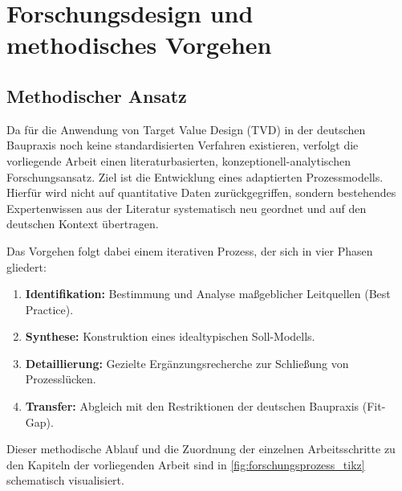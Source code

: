 \chapter{Forschungsdesign und methodisches Vorgehen}
\label{ch:3}

\section{Methodischer Ansatz}
\label{sec:3.1}

Da für die Anwendung von Target Value Design (\acs{TVD}) in der deutschen Baupraxis noch keine standardisierten Verfahren existieren, verfolgt die vorliegende Arbeit einen literaturbasierten, konzeptionell-analytischen Forschungsansatz. Ziel ist die Entwicklung eines adaptierten Prozessmodells. Hierfür wird nicht auf quantitative Daten zurückgegriffen, sondern bestehendes Expertenwissen aus der Literatur systematisch neu geordnet und auf den deutschen Kontext übertragen.

Das Vorgehen folgt dabei einem iterativen Prozess, der sich in vier Phasen gliedert:
\begin{enumerate}
    \item \textbf{Identifikation:} Bestimmung und Analyse maßgeblicher Leitquellen (Best Practice).
    \item \textbf{Synthese:} Konstruktion eines idealtypischen Soll-Modells.
    \item \textbf{Detaillierung:} Gezielte Ergänzungsrecherche zur Schließung von Prozesslücken.
    \item \textbf{Transfer:} Abgleich mit den Restriktionen der deutschen Baupraxis (Fit-Gap).
\end{enumerate}

Dieser methodische Ablauf und die Zuordnung der einzelnen Arbeitsschritte zu den Kapiteln der vorliegenden Arbeit sind in \cref{fig:forschungsprozess_tikz} schematisch visualisiert.


